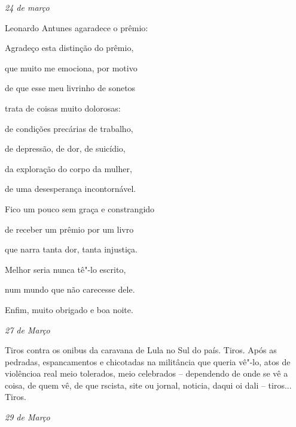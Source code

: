 \begin{flushright}
\emph{24 de março}
\end{flushright}

Leonardo Antunes agaradece o prêmio:

Agradeço esta distinção do prêmio,

que muito me emociona, por motivo

de que esse meu livrinho de sonetos

trata de coisas muito dolorosas:

de condições precárias de trabalho,

de depressão, de dor, de suicídio,

da exploração do corpo da mulher,

de uma desesperança incontornável.

Fico um pouco sem graça e constrangido

de receber um prêmio por um livro

que narra tanta dor, tanta injustiça.

Melhor seria nunca tê"-lo escrito,

num mundo que não carecesse dele.

Enfim, muito obrigado e boa noite.

\begin{flushright}
\emph{27 de Março}
\end{flushright}

Tiros contra os onibus da caravana de Lula no Sul do país. Tiros. Após
as pedradas, espancamentos e chicotadas na militância que queria vê"-lo,
atos de violêncioa real meio tolerados, meio celebrados -- dependendo de
onde se vê a coisa, de quem vê, de que rscista, site ou jornal, noticia,
daqui oi dali -- tiros... Tiros.

\begin{flushright}
\emph{29 de Março}
\end{flushright}

